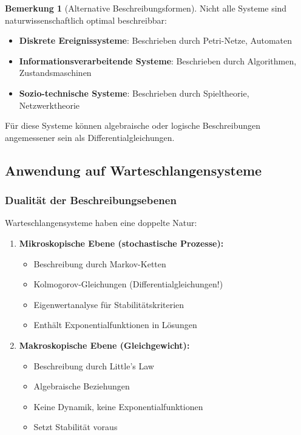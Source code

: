 ﻿\documentclass[a4paper,12pt]{scrreprt}
\theoremstyle{definition}
\newtheorem{bemerkung}{Bemerkung}[section]
\begin{document}
\begin{bemerkung}[Alternative Beschreibungsformen]
	Nicht alle Systeme sind naturwissenschaftlich optimal beschreibbar:
	\begin{itemize}
		\item[-] \textbf{Diskrete Ereignissysteme}: Beschrieben durch Petri-Netze, Automaten
		\item[-] \textbf{Informationsverarbeitende Systeme}: Beschrieben durch Algorithmen, Zustandsmaschinen
		\item[-] \textbf{Sozio-technische Systeme}: Beschrieben durch Spieltheorie, Netzwerktheorie
	\end{itemize}
	
	Für diese Systeme können algebraische oder logische Beschreibungen angemessener sein als Differentialgleichungen.
\end{bemerkung}

\subsection{Anwendung auf Warteschlangensysteme}

\subsubsection{Dualität der Beschreibungsebenen}

Warteschlangensysteme haben eine doppelte Natur:

\begin{enumerate}
	\item[-] \textbf{Mikroskopische Ebene (stochastische Prozesse):}
	\begin{itemize}
		\item[-] Beschreibung durch Markov-Ketten
		\item[-] Kolmogorov-Gleichungen (Differentialgleichungen!)
		\item[-] Eigenwertanalyse für Stabilitätskriterien
		\item[-] Enthält Exponentialfunktionen in Lösungen
	\end{itemize}
	
	\item[-] \textbf{Makroskopische Ebene (Gleichgewicht):}
	\begin{itemize}
		\item[-] Beschreibung durch Little's Law
		\item[-] Algebraische Beziehungen
		\item[-] Keine Dynamik, keine Exponentialfunktionen
		\item[-] Setzt Stabilität voraus
	\end{itemize}
\end{enumerate}
\end{document}
